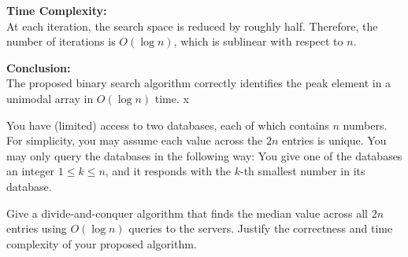 \documentclass[11pt]{article}
\begin{document}
    \bigskip
    
    \textbf{Time Complexity:} \\
    At each iteration, the search space is reduced by roughly half. Therefore, the number of iterations is \( O(\log n) \), which is sublinear with respect to \( n \).
    
    \bigskip
    
    \textbf{Conclusion:} \\
    The proposed binary search algorithm correctly identifies the peak element in a unimodal array in \( O(\log n) \) time.
x    
    
    \newpage
    
    \begin{tcolorbox}[title={Problem 2 (Two-Server Search, 35 pts)}]
        You have (limited) access to two databases, each of which contains $n$ numbers. For simplicity, you may assume each value across the $2n$ entries is unique. You may only query the databases in the following way: You give one of the databases an integer $1\leq k \leq n$, and it responds with the $k$-th smallest number in its database.
        \medskip
        
        Give a divide-and-conquer algorithm that finds the median value across all $2n$ entries using $O(\log n)$ queries to the servers. Justify the correctness and time complexity of your proposed algorithm.
    \end{tcolorbox}

    \newpage
\end{document}
